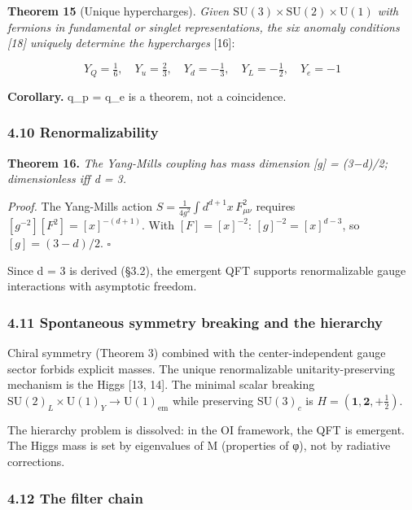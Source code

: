 \documentclass[
]{article}
\begin{document}
\textbf{Theorem 15} (Unique hypercharges). \emph{Given
\(\mathrm{SU}(3) \times \mathrm{SU}(2) \times \mathrm{U}(1)\) with
fermions in fundamental or singlet representations, the six anomaly
conditions {[}18{]} uniquely determine the hypercharges} {[}16{]}:

\[Y_Q = \tfrac{1}{6}, \quad Y_u = \tfrac{2}{3}, \quad Y_d = -\tfrac{1}{3}, \quad Y_L = -\tfrac{1}{2}, \quad Y_e = -1\]

\textbf{Corollary.} \textbar q\_p\textbar{} = \textbar q\_e\textbar{} is
a theorem, not a coincidence.

\hypertarget{renormalizability}{%
\subsubsection{4.10 Renormalizability}\label{renormalizability}}

\textbf{Theorem 16.} \emph{The Yang-Mills coupling has mass dimension
{[}g{]} = (3−d)/2; dimensionless iff d = 3.}

\emph{Proof.} The Yang-Mills action
\(S = \frac{1}{4g^2}\int d^{d+1}x\,F_{\mu\nu}^2\) requires
\([g^{-2}][F^2] = [x]^{-(d+1)}\). With \([F] = [x]^{-2}\):
\([g]^{-2} = [x]^{d-3}\), so \([g] = (3-d)/2\). \(\square\)

Since d = 3 is derived (§3.2), the emergent QFT supports renormalizable
gauge interactions with asymptotic freedom.

\hypertarget{spontaneous-symmetry-breaking-and-the-hierarchy}{%
\subsubsection{4.11 Spontaneous symmetry breaking and the
hierarchy}\label{spontaneous-symmetry-breaking-and-the-hierarchy}}

Chiral symmetry (Theorem 3) combined with the center-independent gauge
sector forbids explicit masses. The unique renormalizable
unitarity-preserving mechanism is the Higgs {[}13, 14{]}. The minimal
scalar breaking
\(\mathrm{SU}(2)_L \times \mathrm{U}(1)_Y \to \mathrm{U}(1)_{\text{em}}\)
while preserving \(\mathrm{SU}(3)_c\) is
\(H = (\mathbf{1}, \mathbf{2}, +\tfrac{1}{2})\).

The hierarchy problem is dissolved: in the OI framework, the QFT is
emergent. The Higgs mass is set by eigenvalues of M (properties of φ),
not by radiative corrections.

\hypertarget{the-filter-chain}{%
\subsubsection{4.12 The filter chain}\label{the-filter-chain}}
\end{document}
